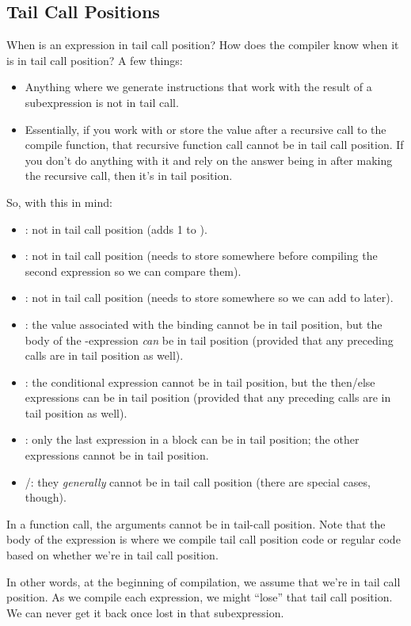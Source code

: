 \documentclass[letterpaper]{article}
\begin{document}
\subsection{Tail Call Positions}
When is an expression in tail call position? How does the compiler know when it is in tail call position? A few things: 
\begin{itemize}
    \item Anything where we generate instructions that work with the result of a subexpression is not in tail call.  
    \item Essentially, if you work with  or store the value after a recursive call to the compile function, that recursive function call cannot be in tail call position. If you don't do anything with it and rely on the answer being in  after making the recursive call, then it's in tail position.
\end{itemize}
So, with this in mind: 
\begin{itemize}
    \item {}: not in tail call position (adds 1 to ). 
    \item {}: not in tail call position (needs to store  somewhere before compiling the second expression so we can compare them).
    \item {}: not in tail call position (needs to store  somewhere so we can add to  later).
    \item {}: the value associated with the binding cannot be in tail position, but the body of the -expression \emph{can} be in tail position (provided that any preceding calls are in tail position as well).
    \item {}: the conditional expression cannot be in tail position, but the then/else expressions can be in tail position (provided that any preceding calls are in tail position as well).
    \item {}: only the last expression in a block can be in tail position; the other expressions cannot be in tail position. 
    \item {}/: they \emph{generally} cannot be in tail call position (there are special cases, though).
\end{itemize}
In a function call, the arguments cannot be in tail-call position. Note that the body of the expression is where we compile tail call position code or regular code based on whether we're in tail call position. 

\bigskip 

In other words, at the beginning of compilation, we assume that we're in tail call position. As we compile each expression, we might ``lose'' that tail call position. We can never get it back once lost in that subexpression.
\end{document}
